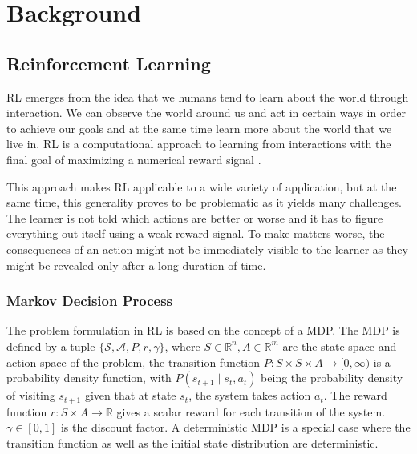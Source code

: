\chapter{Background}
\label{ch:background}

\section{Reinforcement Learning}


\label{sec:background_rl}

\ac{RL} emerges from the idea that we humans tend to learn about the world through interaction. We can observe the world around us and act in certain ways in order to achieve our goals and at the same time learn more about the world that we live in. \ac{RL} is a computational approach to learning from interactions with the final goal of maximizing a numerical reward signal \cite{rlbook}.

This approach makes \ac{RL} applicable to a wide variety of application, but at the same time, this generality proves to be problematic as it yields many challenges. The learner is not told which actions are better or worse and it has to figure everything out itself using a weak reward signal. To make matters worse, the consequences of an action might not be immediately visible to the learner as they might be revealed only after a long duration of time.


\subsection{Markov Decision Process}

The problem formulation in \ac{RL} is based on the concept of a \ac{MDP}. The \ac{MDP} is defined by a tuple $\{\mathcal{S}, \mathcal{A}, P, r, \gamma\}$, where $S \in \mathbb R^n, A \in \mathbb R^m$ are the state space and action space of the problem, the transition function $P: S \times S \times A \to [0, \infty)$ 
is a probability density function, with $P(s_{t+1} \mid s_t, a_t)$ being the probability density of visiting $s_{t+1}$ given that at state $s_t$, the system takes action $a_t$.
The reward function $r: S\times A \to \mathbb R$ gives a scalar reward for each transition of the system. 
$\gamma \in [0, 1]$ is the discount factor. A deterministic \ac{MDP} is a special case where the transition function as well as the initial state distribution are deterministic.

